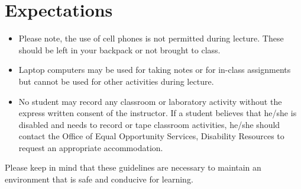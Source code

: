 
\section{Expectations}
\begin{itemize}
\item Please note, the use of cell phones is not permitted during lecture.  
These should be left in your backpack or not brought to class. 
\item Laptop computers may be used for taking notes or for in-class assignments but cannot be used for other activities during lecture.
\item No student may record any classroom or laboratory activity without the express written consent of the instructor. 
If a student believes that he/she is disabled and needs to record or tape classroom activities,
 he/she should contact the Office of Equal Opportunity Services, Disability Resources to request an appropriate accommodation. 
 \end{itemize}
 
Please keep in mind that these guidelines are necessary to maintain an environment that is safe and conducive for learning.
 
